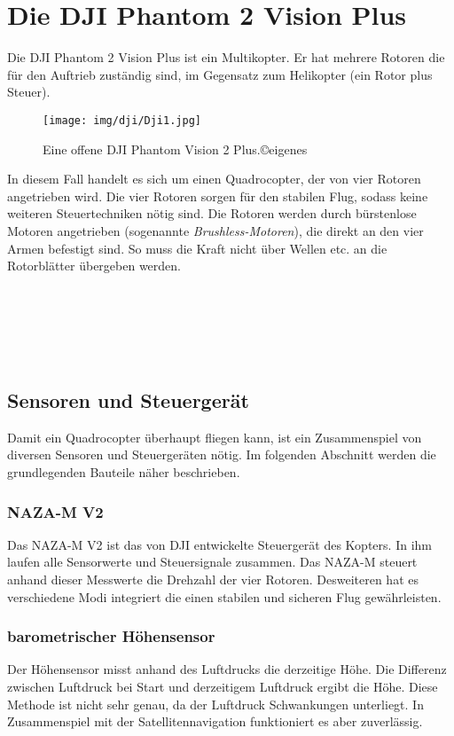 \section{Die DJI Phantom 2 Vision Plus\cite{phantom}}
Die DJI Phantom 2 Vision Plus ist ein Multikopter. Er hat mehrere Rotoren die für den Auftrieb zuständig sind, im Gegensatz zum Helikopter (ein Rotor plus Steuer).
\begin{wrapfigure}{l}{0.6\textwidth}
  \begin{center}
    \texttt{[image: img/dji/Dji1.jpg]}
  \end{center}
  \label{dji}
  \caption{Eine offene DJI Phantom Vision 2 Plus.©eigenes}
\end{wrapfigure} In diesem Fall handelt es sich um einen Quadrocopter, der von vier Rotoren angetrieben wird. Die vier Rotoren sorgen für den stabilen Flug, sodass keine weiteren Steuertechniken nötig sind. Die Rotoren werden durch bürstenlose Motoren angetrieben (sogenannte \textit{Brushless-Motoren}), die direkt an den vier Armen befestigt sind. So muss die Kraft nicht über Wellen etc. an die Rotorblätter übergeben werden. 
\\
\\
\\
\\
\\
\\
\subsection{Sensoren und Steuergerät}

Damit ein Quadrocopter überhaupt fliegen kann, ist ein Zusammenspiel von diversen Sensoren und Steuergeräten nötig. Im folgenden Abschnitt werden die grundlegenden Bauteile näher beschrieben.\\
\subsubsection*{NAZA-M V2}
Das NAZA-M V2 ist das von DJI entwickelte Steuergerät des Kopters. In ihm laufen alle Sensorwerte und Steuersignale zusammen. Das NAZA-M steuert anhand dieser Messwerte die Drehzahl der vier Rotoren. Desweiteren hat es verschiedene Modi integriert die einen stabilen und sicheren Flug gewährleisten.\\
\subsubsection*{barometrischer Höhensensor}
Der Höhensensor misst anhand des Luftdrucks die derzeitige Höhe. Die Differenz zwischen Luftdruck bei Start und derzeitigem Luftdruck ergibt die Höhe. Diese Methode ist nicht sehr genau, da der Luftdruck Schwankungen unterliegt. In Zusammenspiel mit der Satellitennavigation funktioniert es aber zuverlässig.\\
